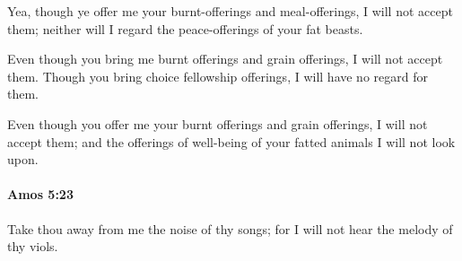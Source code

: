 			\begin{versebox}
					\item[BHS] 
					\item[LXX] 
					\item[ASV] Yea, though ye offer me your burnt-offerings and meal-offerings, I will not accept them; neither will I regard the peace-offerings of your fat beasts.
					\item[NIV] Even though you bring me burnt offerings and grain offerings, I will not accept them. Though you bring choice fellowship offerings, I will have no regard for them.
					\item[NRSV] Even though you offer me your burnt offerings and grain offerings, I will not accept them; and the offerings of well-being of your fatted animals I will not look upon.
			\end{versebox}

		\paragraph{Amos 5:23} %
			\label{AMOS-5-23}

			Take thou away from me the noise of thy songs; for I will not hear the melody of thy viols.

